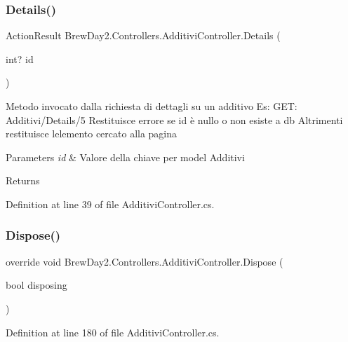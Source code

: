 \subsubsection{\texorpdfstring{Details()}{Details()}}
{\footnotesize\ttfamily Action\+Result Brew\+Day2.\+Controllers.\+Additivi\+Controller.\+Details (\begin{DoxyParamCaption}\item[{int?}]{id }\end{DoxyParamCaption})}



Metodo invocato dalla richiesta di dettagli su un additivo Es\+: G\+ET\+: Additivi/\+Details/5 Restituisce errore se id è nullo o non esiste a db Altrimenti restituisce l\textquotesingle{}elemento cercato alla pagina 


\begin{DoxyParams}{Parameters}
{\em id} & Valore della chiave per model Additivi\\
\hline
\end{DoxyParams}
\begin{DoxyReturn}{Returns}

\end{DoxyReturn}


Definition at line 39 of file Additivi\+Controller.\+cs.

\mbox{\label{class_brew_day2_1_1_controllers_1_1_additivi_controller_aa678739843674fffd0f20c51e84bf78e}} 
\subsubsection{\texorpdfstring{Dispose()}{Dispose()}}
{\footnotesize\ttfamily override void Brew\+Day2.\+Controllers.\+Additivi\+Controller.\+Dispose (\begin{DoxyParamCaption}\item[{bool}]{disposing }\end{DoxyParamCaption})\hspace{0.3cm}{\ttfamily [protected]}}



Definition at line 180 of file Additivi\+Controller.\+cs.

